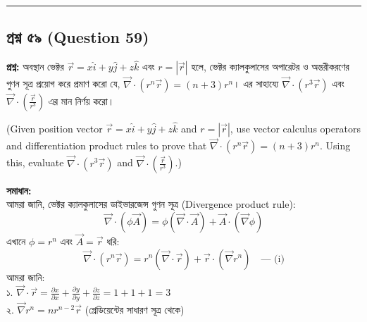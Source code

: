 \documentclass[12pt]{article}
\begin{document}
\vspace{0.8cm}

\noindent\rule{\textwidth}{1pt}
\subsection*{প্রশ্ন ৫৯ (Question 59)}

\textbf{প্রশ্ন:} অবস্থান ভেক্টর $\vec{r} = x\hat{i} + y\hat{j} + z\hat{k}$ এবং $r = |\vec{r}|$ হলে, ভেক্টর ক্যালকুলাসের অপারেটর ও অন্তরীকরণের গুণন সূত্র প্রয়োগ করে প্রমাণ করো যে, $\vec{\nabla} \cdot (r^n \vec{r}) = (n+3)r^n$। এর সাহায্যে $\vec{\nabla} \cdot (r^3 \vec{r})$ এবং $\vec{\nabla} \cdot \left(\frac{\vec{r}}{r^3}\right)$ এর মান নির্ণয় করো।

(Given position vector $\vec{r} = x\hat{i} + y\hat{j} + z\hat{k}$ and $r = |\vec{r}|$, use vector calculus operators and differentiation product rules to prove that $\vec{\nabla} \cdot (r^n \vec{r}) = (n+3)r^n$. Using this, evaluate $\vec{\nabla} \cdot (r^3 \vec{r})$ and $\vec{\nabla} \cdot \left(\frac{\vec{r}}{r^3}\right)$.)

\begin{center}
\end{center}

\textbf{সমাধান:} \\
আমরা জানি, ভেক্টর ক্যালকুলাসের ডাইভারজেন্স গুণন সূত্র (Divergence product rule):
$$\vec{\nabla} \cdot (\phi \vec{A}) = \phi(\vec{\nabla} \cdot \vec{A}) + \vec{A} \cdot (\vec{\nabla}\phi)$$
এখানে $\phi = r^n$ এবং $\vec{A} = \vec{r}$ ধরি:
$$\vec{\nabla} \cdot (r^n \vec{r}) = r^n(\vec{\nabla} \cdot \vec{r}) + \vec{r} \cdot (\vec{\nabla}r^n) \quad \text{--- (i)}$$
আমরা জানি: \\
১. $\vec{\nabla} \cdot \vec{r} = \frac{\partial x}{\partial x} + \frac{\partial y}{\partial y} + \frac{\partial z}{\partial z} = 1 + 1 + 1 = 3$ \\
২. $\vec{\nabla}r^n = n r^{n-2} \vec{r}$ (গ্রেডিয়েন্টের সাধারণ সূত্র থেকে)
\end{document}
